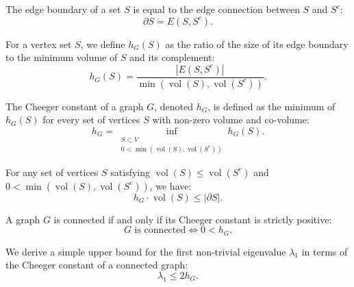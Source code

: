 \begin{lemma}
\label{lem:self_connection_eq_boundary}
\leanok
The edge boundary of a set $S$ is equal to the edge connection between $S$ and $S^c$:
$$
\partial S = E(S, S^c).
$$
\end{lemma}

\begin{definition}
\label{def:hG}
\leanok
For a vertex set $S$, we define $h_G(S)$ as the ratio of the size of its edge boundary to the minimum volume of $S$ and its complement:
$$
h_G(S) = \frac{|E(S, S^c)|}{\min(\operatorname{vol}(S), \operatorname{vol}(S^c))}.
$$
\end{definition}

\begin{definition}
\label{def:cheeger}
\leanok
The Cheeger constant of a graph $G$, denoted $h_G$, is defined as the minimum of $h_G(S)$ for every set of vertices $S$ with non-zero volume and co-volume:
$$
h_G = \inf_{\substack{S \subset V \\ 0 < \min(\operatorname{vol}(S), \operatorname{vol}(S^c))}} h_G(S).
$$
\end{definition}

\begin{lemma}
\label{lem:cheeger_mul_volume_le_volume_frontier}
\leanok
For any set of vertices $S$ satisfying $\operatorname{vol}(S) \le \operatorname{vol}(S^c)$ and $0 < \min(\operatorname{vol}(S), \operatorname{vol}(S^c))$, we have:
$$
h_G \cdot \operatorname{vol}(S) \le |\partial S|.
$$
\end{lemma}

\begin{lemma}
\label{lem:connected_iff_cheeger_pos}
A graph $G$ is connected if and only if its Cheeger constant is strictly positive:
$$
G \text{ is connected} \iff 0 < h_G.
$$
\end{lemma}

\begin{lemma}
\label{lem:two_cheegerV_ge_first_eigval}
We derive a simple upper bound for the first non-trivial eigenvalue $\lambda_1$ in terms of the Cheeger constant of a connected graph:
$$
\lambda_1 \le 2 h_G.
$$
\end{lemma}

